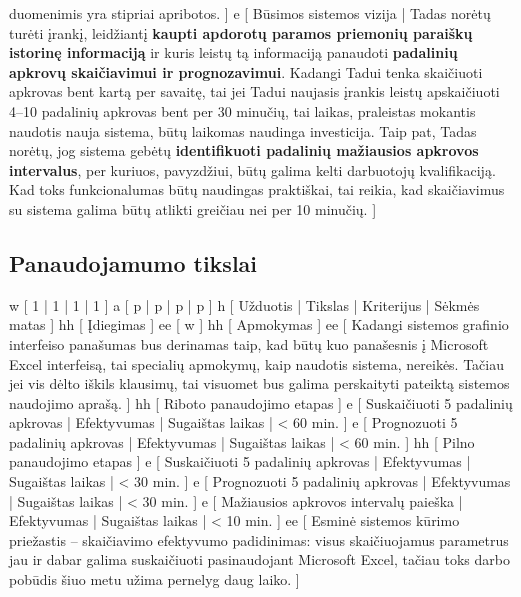 {    duomenimis yra stipriai apribotos.
  ]
  e [ Būsimos sistemos vizija
  | 
    Tadas norėtų turėti įrankį, leidžiantį \textbf{kaupti apdorotų paramos priemonių paraiškų
    istorinę informaciją} ir kuris leistų tą informaciją panaudoti \textbf{padalinių apkrovų 
    skaičiavimui ir prognozavimui}.
    Kadangi Tadui tenka skaičiuoti apkrovas bent kartą per savaitę, tai jei Tadui naujasis 
    įrankis leistų apskaičiuoti 4–10 padalinių apkrovas bent per 30 minučių, 
    tai laikas, praleistas mokantis naudotis nauja sistema, būtų laikomas naudinga investicija.
    Taip pat, Tadas norėtų, jog sistema gebėtų \textbf{identifikuoti padalinių
    mažiausios apkrovos intervalus}, per kuriuos, pavyzdžiui, būtų galima kelti darbuotojų
    kvalifikaciją. Kad toks funkcionalumas būtų naudingas praktiškai, tai 
    reikia, kad skaičiavimus su sistema galima būtų atlikti greičiau
    nei per 10 minučių.
  ]
}

\subsection{Panaudojamumo tikslai}
\xtable
{
  w [ 1 | 1 | 1 | 1 ]
  a [ p | p | p | p ]
  h [ Užduotis | Tikslas | Kriterijus | Sėkmės matas ]
  hh [ Įdiegimas ]
  ee [ w ]
  hh [ Apmokymas ]
  ee 
  [ 
    Kadangi sistemos grafinio interfeiso panašumas bus derinamas taip, kad būtų kuo panašesnis
    į Microsoft Excel interfeisą, tai specialių apmokymų, kaip naudotis sistema, nereikės. Tačiau
    jei vis dėlto iškils klausimų, tai visuomet bus galima perskaityti pateiktą sistemos
    naudojimo aprašą. 
  ]
  hh [ Riboto panaudojimo etapas ]
  e [ Suskaičiuoti 5 padalinių apkrovas | Efektyvumas | Sugaištas laikas | < 60 min. ]
  e [ Prognozuoti 5 padalinių apkrovas | Efektyvumas | Sugaištas laikas | < 60 min. ]
  hh [ Pilno panaudojimo etapas ]
  e [ Suskaičiuoti 5 padalinių apkrovas | Efektyvumas | Sugaištas laikas | < 30 min. ]
  e [ Prognozuoti 5 padalinių apkrovas | Efektyvumas | Sugaištas laikas | < 30 min. ]
  e [ Mažiausios apkrovos intervalų paieška | Efektyvumas | Sugaištas laikas | < 10 min. ]
  ee 
  [ 
    Esminė sistemos kūrimo priežastis – skaičiavimo efektyvumo padidinimas: visus skaičiuojamus
    parametrus jau ir dabar galima suskaičiuoti pasinaudojant Microsoft Excel, tačiau toks
    darbo pobūdis šiuo metu užima pernelyg daug laiko.
  ]
}

